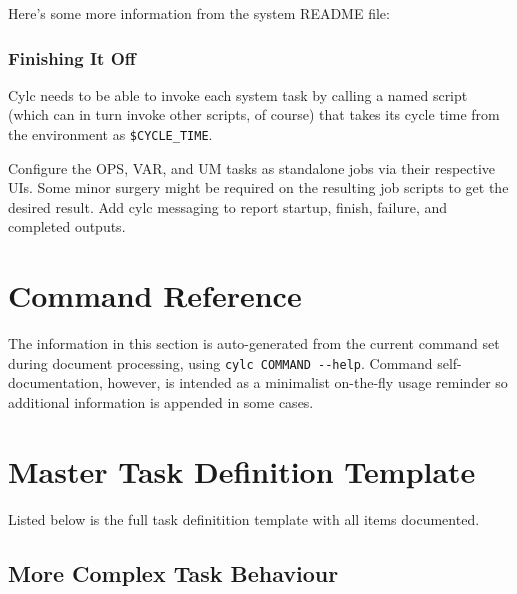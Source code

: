 \documentclass[11pt,a4paper]{article}
\begin{document}
Here's some more information from the system README file:

\lstset{language=}


\subsubsection{Finishing It Off}

Cylc needs to be able to invoke each system task by calling a named
script (which can in turn invoke other scripts, of course) that takes
its cycle time from the environment as  \lstinline=$CYCLE_TIME=.

Configure the OPS, VAR, and UM tasks as standalone jobs via their
respective UIs. Some minor surgery might be required on the resulting
job scripts to get the desired result.  Add cylc messaging to report
startup, finish, failure, and completed outputs.

\pagebreak
\section{Command Reference}
\label{CommandReference}

The information in this section is auto-generated from
the current command set during document processing, using  
\lstinline=cylc COMMAND --help=. 
Command self-documentation, however, is intended as a minimalist
on-the-fly usage reminder so additional information is appended in
some cases.
  
\lstset{language=usage}



\section{Master Task Definition Template}
\label{MasterTaskDefinitionTemplate}

Listed below is the full task definitition template with all items
documented.

\lstset{language=cylctaskdef}



\lstset{language=}

\pagebreak
\subsection{More Complex Task Behaviour}
\label{MoreComplexTaskBehaviour}
\end{document}
